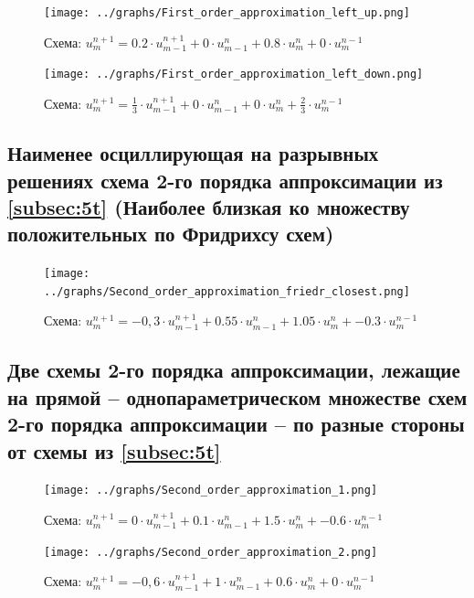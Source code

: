 \documentclass[a4paper, 12pt]{article} %
\begin{document}
\newpage
\begin{figure}[h!]
    \centering
    \texttt{[image: ../graphs/First\_order\_approximation\_left\_up.png]}
    \caption{Схема: $u^{n+1}_{m} = 0.2 \cdot u^{n+1}_{m-1} + 0 \cdot u^{n}_{m-1} + 0.8 \cdot u^{n}_{m} + 0 \cdot u^{n-1}_{m}$}
    \label{fig:vac}
\end{figure} 

\begin{figure}[h!]
    \centering
    \texttt{[image: ../graphs/First\_order\_approximation\_left\_down.png]}
    \caption{Схема: $u^{n+1}_{m} = \frac{1}{3} \cdot u^{n+1}_{m-1} + 0 \cdot u^{n}_{m-1} + 0 \cdot u^{n}_{m} + \frac{2}{3} \cdot u^{n-1}_{m}$}
    \label{fig:vac}
\end{figure} 

\newpage
\subsection{Наименее осциллирующая на разрывных решениях схема 2-го порядка аппроксимации из \ref{subsec:5t} (Наиболее близкая ко множеству положительных по Фридрихсу схем)}
\label{subsec:2p}
\begin{figure}[h!]
    \centering
    \texttt{[image: ../graphs/Second\_order\_approximation\_friedr\_closest.png]}
    \caption{Схема: $u^{n+1}_{m} = -0,3 \cdot u^{n+1}_{m-1} + 0.55 \cdot u^{n}_{m-1} + 1.05 \cdot u^{n}_{m} + -0.3 \cdot u^{n-1}_{m}$ \\ }
    \label{fig:vac}
\end{figure} 

\newpage
\subsection{Две схемы 2-го порядка аппроксимации, лежащие на прямой – однопараметрическом множестве схем 2-го порядка аппроксимации – по разные стороны от схемы из \ref{subsec:5t}}
\label{subsec:3p}
\begin{figure}[h!]
    \centering
    \texttt{[image: ../graphs/Second\_order\_approximation\_1.png]}
    \caption{Схема: $u^{n+1}_{m} = 0 \cdot u^{n+1}_{m-1} + 0.1 \cdot u^{n}_{m-1} + 1.5 \cdot u^{n}_{m} + -0.6 \cdot u^{n-1}_{m}$ \\ }
    \label{fig:vac}
\end{figure} 

\begin{figure}[h!]
    \centering
    \texttt{[image: ../graphs/Second\_order\_approximation\_2.png]}
    \caption{Схема: $u^{n+1}_{m} = -0,6 \cdot u^{n+1}_{m-1} + 1 \cdot u^{n}_{m-1} + 0.6 \cdot u^{n}_{m} + 0 \cdot u^{n-1}_{m}$ \\ }
    \label{fig:vac}
\end{figure} 
\end{document}
